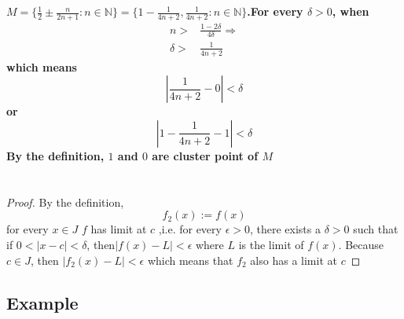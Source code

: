 \documentclass{article}
\begin{document}
    \section{}
        \paragraph{
            $M=\{\frac{1}{2}\pm \frac{n}{2n+1}:n\in \mathbb{N}\}=\{1-\frac{1}{4n+2},\frac{1}{4n+2}:n\in \mathbb{N}\}$.For every $\delta >0$, when 
            \begin{equation*}
                \begin{split}
                    n>&\frac{1-2\delta}{4\delta}\Rightarrow\\
                    \delta>&\frac{1}{4n+2}
                \end{split}
            \end{equation*}
            which means $$|\frac{1}{4n+2}-0|<\delta$$
            or 
            $$|1-\frac{1}{4n+2}-1|<\delta$$
            By the definition, $1$ and $0$ are cluster point of $M$
        }
    
    \section{}
        \begin{proof}
            By the definition,$$f_2(x):=f(x)$$
            for every $x\in J$
            $f$ has limit at $c$ ,i.e. for every $\epsilon>0$, there exists a $\delta>0$ such that if $0<|x-c|<\delta$, then$|f(x)-L|<\epsilon$ where $L$ is the limit of $f(x)$.
            Because $c\in J$, then $|f_2(x)-L|<\epsilon$ which means that $f_2$ also has a limit at $c$
        \end{proof}
        \subsection*{Example}
\end{document}
